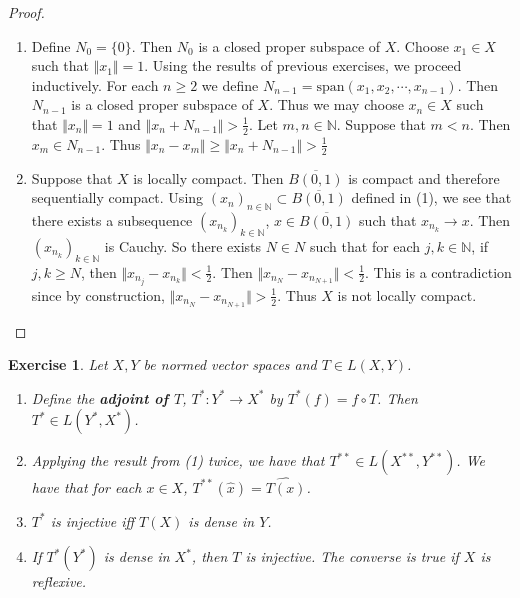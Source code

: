 \documentclass[12pt]{amsart}
\newtheorem{ex}[thm]{Exercise}
\newcommand{\N}{\mathbb{N}}
\newcommand{\conv}[1]{\xrightarrow{#1}}
\newcommand{\n}{\Vert}
\begin{document}
\begin{proof}
\begin{enumerate}
\item Define $N_0 = \{0\}$. Then $N_0$ is a closed proper subspace of $X$. Choose $x_1 \in X$ such that $\n x_1 \n = 1$. Using the results of previous exercises, we proceed inductively. For each $n \geq 2$ we define $N_{n-1} = \text{span}(x_1, x_2, \cdots, x_{n-1})$. Then $N_{n-1}$ is a closed proper subspace of $X$. Thus we may choose $x_n \in X$ such that $\n x_n \n = 1$ and $\n x_n + N_{n-1} \n >  \frac{1}{2}$. Let $m,n \in \N$. Suppose that $m<n$. Then $x_m \in N_{n-1}$. Thus $\n x_n - x_m \n \geq \n x_n + N_{n-1} \n > \frac{1}{2}$\vspace{.5cm}\\
\item Suppose that $X$ is locally compact. Then $\overline{B(0,1)}$ is compact and therefore sequentially compact. Using $(x_n)_{n \in \N} \subset \overline{B(0,1)}$ defined in (1), we see that there exists a subsequence $(x_{n_k})_{k \in \N}$, $x \in \overline{B(0,1)}$ such that $x_{n_k} \conv{} x$. Then $(x_{n_k})_{k \in \N}$ is Cauchy. So there exists $N \in N$ such that for each $j, k \in \N$, if $j, k \geq N$, then $\n x_{n_j} - x_{n_k} \n < \frac{1}{2}$. Then $\n x_{n_N} - x_{n_{N+1}} \n  < \frac{1}{2}$. This is a contradiction since by construction, $\n x_{n_N} - x_{n_{N+1}} \n  > \frac{1}{2}$. Thus $X$ is not locally compact.
\end{enumerate}
\end{proof}

\begin{ex}
Let $X,Y$ be normed vector spaces and $T \in L(X,Y)$. 
\begin{enumerate}
\item Define the \textbf{adjoint of $T$}, $T^*:Y^* \rightarrow X^*$ by $T^*(f) = f \circ T$. Then $T^* \in L(Y^*, X^*)$.
\item Applying the result from (1) twice, we have that $T^{**} \in L(X^{**},Y^{**})$. We have that for each $x \in X$, $T^{**}(\hat{x}) = \widehat{T(x)}$.
\item $T^*$ is injective iff $T(X)$ is dense in $Y$.
\item If $T^*(Y^*)$ is dense in $X^*$, then $T$ is injective. The converse is true if $X$ is reflexive.
\end{enumerate}
\end{ex}
\end{document}

